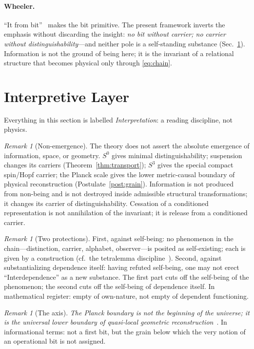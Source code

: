 \documentclass[11pt,a4paper]{article}
\theoremstyle{definition}
\theoremstyle{remark}
\newtheorem{remark}[theorem]{Remark}
\newcommand{\Szero}{S^{0}}
\newcommand{\Sthree}{S^{3}}
\begin{document}
\paragraph{Wheeler.}  ``It from bit''~\cite{Wheeler1990} makes the bit primitive.  The present
framework inverts the emphasis without discarding the insight: \emph{no bit without carrier; no
carrier without distinguishability}---and neither pole is a self-standing substance
(Sec.~\ref{sec:interpretation}).  Information is not the ground of being here; it is the
invariant of a relational structure that becomes physical only through
\eqref{eq:chain}.

\section{Interpretive Layer}
\label{sec:interpretation}

Everything in this section is labelled \emph{Interpretation}: a reading discipline, not physics.

\begin{remark}[Non-emergence]
The theory does not assert the absolute emergence of information, space, or geometry.
$\Szero$ gives minimal distinguishability; suspension changes its carriers
(Theorem~\ref{thm:transport}); $\Sthree$ gives the special compact spin/Hopf carrier; the Planck
scale gives the lower metric-causal boundary of physical reconstruction
(Postulate~\ref{post:grain}).  Information is not produced from non-being and is not destroyed
inside admissible structural transformations; it changes its carrier of distinguishability.
Cessation of a conditioned representation is not annihilation of the invariant; it is release
from a conditioned carrier.
\end{remark}

\begin{remark}[Two protections]
First, against self-being: no phenomenon in the chain---distinction, carrier, alphabet,
observer---is posited as self-existing; each is given by a construction
(cf.\ the tetralemma discipline~\cite{Garfield1995}).  Second, against substantializing
dependence itself: having refuted self-being, one may not erect ``Interdependence'' as a new
substance.  The first part cuts off the self-being of the phenomenon; the second cuts off the
self-being of dependence itself.  In mathematical register: empty of own-nature, not empty of
dependent functioning.
\end{remark}

\begin{remark}[The axis]
\emph{The Planck boundary is not the beginning of the universe; it is the universal lower
boundary of quasi-local geometric reconstruction}~\cite{BP2026ricci}.  In informational terms:
not a first bit, but the grain below which the very notion of an operational bit is not
assigned.
\end{remark}
\end{document}

